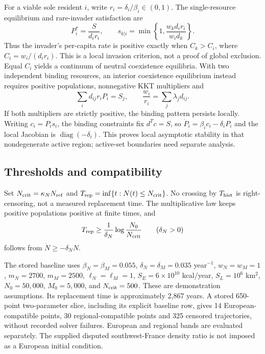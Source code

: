 \documentclass[12pt,a4paper]{article}
\theoremstyle{remark}
\begin{document}
For a viable sole resident $i$, write $r_i=\delta_i/\beta_i\in(0,1)$. The single-resource equilibrium and rare-invader satisfaction are
\begin{equation}\label{eq:invasion}
P_i^*=\frac{S}{d_ir_i},\qquad
s_{k|i}=\min\left\{1,\frac{w_kd_ir_i}{w_id_k}\right\}.
\end{equation}
Thus the invader's per-capita rate is positive exactly when $C_k>C_i$, where $C_i=w_i/(d_ir_i)$. This is a local invasion criterion, not a proof of global exclusion. Equal $C_i$ yields a continuum of neutral coexistence equilibria. With two independent binding resources, an interior coexistence equilibrium instead requires positive populations, nonnegative KKT multipliers and
\[
\sum_i d_{ij}r_iP_i=S_j,\qquad \frac{w_i}{r_i}=\sum_j\lambda_jd_{ij}.
\]
If both multipliers are strictly positive, the binding pattern persists locally. Writing $c_i=P_is_i$, the binding constraints fix $d^Tc=S$, so $\dot P_i=\beta_ic_i-\delta_iP_i$ and the local Jacobian is $\operatorname{diag}(-\delta_i)$. This proves local asymptotic stability in that nondegenerate active region; active-set boundaries need separate analysis.

\subsection{Thresholds and compatibility}
Set $N_{\rm crit}=\kappa_NN_{\rm ref}$ and $T_{\rm rep}=\inf\{t:N(t)\le N_{\rm crit}\}$. No crossing by $T_{\rm hist}$ is right-censoring, not a measured replacement time. The multiplicative law keeps positive populations positive at finite times, and
\begin{equation}
T_{\rm rep}\ge\frac{1}{\delta_N}\log\frac{N_0}{N_{\rm crit}}\qquad(\delta_N>0)
\end{equation}
follows from $\dot N\ge-\delta_NN$.

The stored baseline uses $\beta_N=\beta_M=0.055$, $\delta_N=\delta_M=0.035$ year$^{-1}$, $w_N=w_M=1$, $m_N=2700$, $m_M=2500$, $\ell_N=\ell_M=1$, $S_E=6\times10^{10}$ kcal/year, $S_L=10^6$ km$^2$, $N_0=50,000$, $M_0=5,000$, and $N_{\rm crit}=500$. These are demonstration assumptions. Its replacement time is approximately 2,867 years. A stored 650-point two-parameter slice, including its explicit baseline row, gives 14 European-compatible points, 30 regional-compatible points and 325 censored trajectories, without recorded solver failures. European and regional bands are evaluated separately. The supplied disputed southwest-France density ratio is not imposed as a European initial condition.
\end{document}
